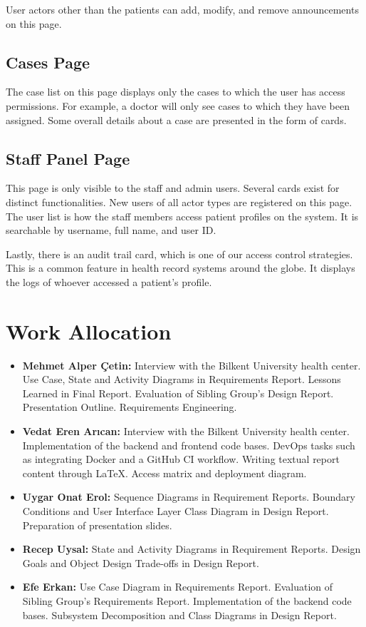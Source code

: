 \documentclass[a4paper, 12pt, titlepage]{article}
\begin{document}
  User actors other than the patients can add, modify, and remove announcements on this page.
  
  \subsection{Cases Page}
  
  The case list on this page displays only the cases to which the user has access permissions.
  For example, a doctor will only see cases to which they have been assigned.
  Some overall details about a case are presented in the form of cards.
  
  \subsection{Staff Panel Page}
  
  This page is only visible to the staff and admin users.
  Several cards exist for distinct functionalities.
  New users of all actor types are registered on this page.
  The user list is how the staff members access patient profiles on the system.
  It is searchable by username, full name, and user ID.
  
  Lastly, there is an audit trail card, which is one of our access control strategies.
  This is a common feature in health record systems around the globe.
  It displays the logs of whoever accessed a patient's profile.
  
  \pagebreak
  \section{Work Allocation}
  
  \begin{itemize}
    \item \textbf{Mehmet Alper Çetin:}
      Interview with the Bilkent University health center.
      Use Case, State and Activity Diagrams in Requirements Report.
      Lessons Learned in Final Report.
      Evaluation of Sibling Group's Design Report.
      Presentation Outline.
      Requirements Engineering.
    \item \textbf{Vedat Eren Arıcan:}
      Interview with the Bilkent University health center.
      Implementation of the backend and frontend code bases.
      DevOps tasks such as integrating Docker and a GitHub CI workflow.
      Writing textual report content through \LaTeX{}. Access matrix and deployment diagram.
    \item \textbf{Uygar Onat Erol:}
      Sequence Diagrams in Requirement Reports.
      Boundary Conditions and User Interface Layer Class Diagram in Design Report.
      Preparation of presentation slides.
    \item \textbf{Recep Uysal:}
      State and Activity Diagrams in Requirement Reports.
      Design Goals and Object Design Trade-offs in Design Report.
    \item \textbf{Efe Erkan:}
      Use Case Diagram in Requirements Report.
      Evaluation of Sibling Group's Requirements Report.
      Implementation of the backend code bases.
      Subsystem Decomposition and Class Diagrams in Design Report.
  \end{itemize}
\end{document}
